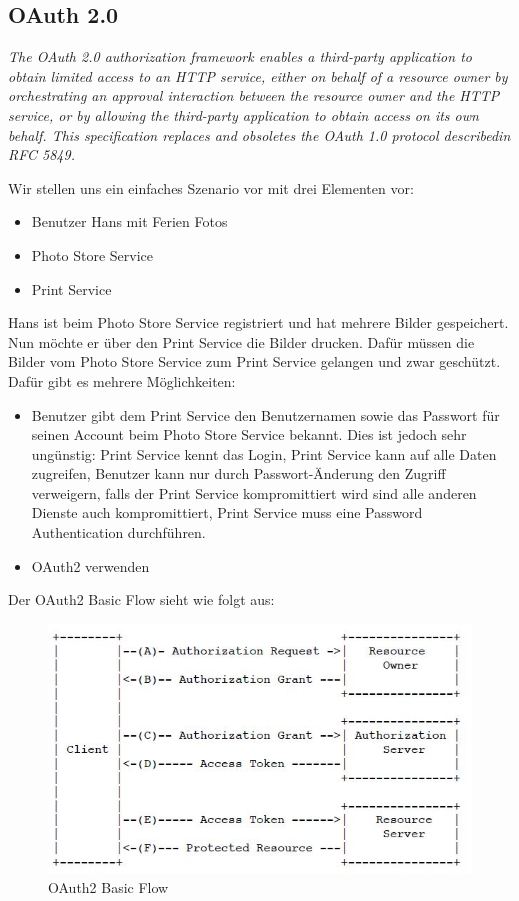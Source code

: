 \subsection{OAuth 2.0}

\textit{The OAuth 2.0 authorization framework enables a third-party
application to obtain limited access to an HTTP service, either on
behalf of a resource owner by orchestrating an approval interaction
between the resource owner and the HTTP service, or by allowing
the third-party application to obtain access on its own behalf. This
specification replaces and obsoletes the OAuth 1.0 protocol
describedin RFC 5849.}

Wir stellen uns ein einfaches Szenario vor mit drei Elementen vor:

\begin{itemize}
	\item Benutzer Hans mit Ferien Fotos
	\item Photo Store Service
	\item Print Service
\end{itemize}

Hans ist beim Photo Store Service registriert und hat mehrere Bilder gespeichert. Nun möchte er über den Print Service die Bilder drucken. Dafür müssen die Bilder vom Photo Store Service zum Print Service gelangen und zwar geschützt. Dafür gibt es mehrere Möglichkeiten:

\begin{itemize}
	\item Benutzer gibt dem Print Service den Benutzernamen sowie das Passwort für seinen Account beim Photo Store Service bekannt. Dies ist jedoch sehr ungünstig: Print Service kennt das Login, Print Service kann auf alle Daten zugreifen, Benutzer kann nur durch Passwort-Änderung den Zugriff verweigern, falls der Print Service kompromittiert wird sind alle anderen Dienste auch kompromittiert, Print Service muss eine Password Authentication durchführen.
	
	\item OAuth2 verwenden
\end{itemize}

Der OAuth2 Basic Flow sieht wie folgt aus:
\begin{figure}[h!]
\centering
\includegraphics[width=0.7\linewidth]{fig/oauth2flow}
\caption{OAuth2 Basic Flow}
\label{fig:oauth2flow}
\end{figure}


